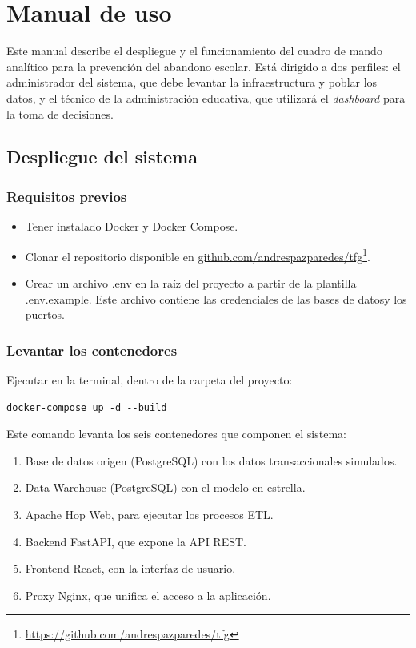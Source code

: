 \chapter{Manual de uso}

Este manual describe el despliegue y el funcionamiento del cuadro de mando analítico para la prevención del abandono escolar. Está dirigido a dos perfiles: el administrador del sistema, que debe levantar la infraestructura y poblar los datos, y el técnico de la administración educativa, que utilizará el \textit{dashboard} para la toma de decisiones.

\section{Despliegue del sistema}

\subsection{Requisitos previos}

\begin{itemize}
    \item Tener instalado Docker y Docker Compose.
    \item Clonar el repositorio disponible en \href{https://github.com/andrespazparedes/tfg}{github.com/andrespazparedes/tfg}\footnote{\url{https://github.com/andrespazparedes/tfg}}.
    \item Crear un archivo .env en la raíz del proyecto a partir de la plantilla .env.example. Este archivo contiene las credenciales de las bases de datosy los puertos.
\end{itemize}

\subsection{Levantar los contenedores}

Ejecutar en la terminal, dentro de la carpeta del proyecto:

\begin{verbatim}
docker-compose up -d --build
\end{verbatim}

Este comando levanta los seis contenedores que componen el sistema:

\begin{enumerate}
    \item Base de datos origen (PostgreSQL) con los datos transaccionales simulados.
    \item Data Warehouse (PostgreSQL) con el modelo en estrella.
    \item Apache Hop Web, para ejecutar los procesos ETL.
    \item Backend FastAPI, que expone la API REST.
    \item Frontend React, con la interfaz de usuario.
    \item Proxy Nginx, que unifica el acceso a la aplicación.
\end{enumerate}

